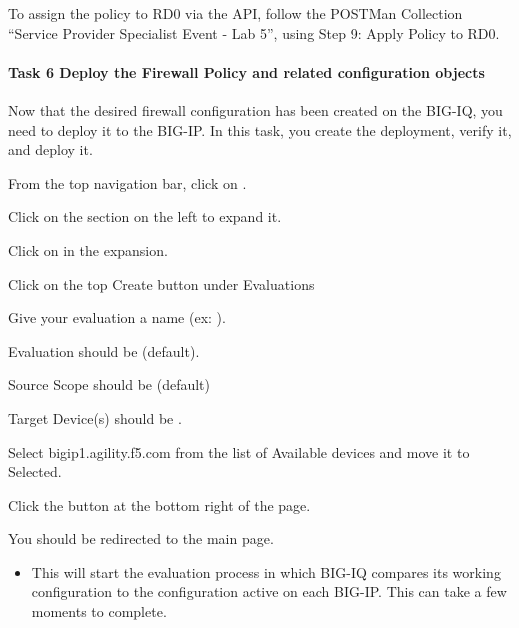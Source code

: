 \documentclass[letterpaper,10pt,english]{sphinxmanual}
\begin{document}
To assign the policy to RD0 via the API, follow the POSTMan
Collection “Service Provider Specialist Event - Lab 5”, using Step
9: Apply Policy to RD0.


\paragraph{Task 6 \textendash{} Deploy the Firewall Policy and related configuration objects}
\label{\detokenize{class1/module5/lab1:task-6-deploy-the-firewall-policy-and-related-configuration-objects}}
Now that the desired firewall configuration has been created on the
BIG-IQ, you need to deploy it to the BIG-IP. In this task, you create
the deployment, verify it, and deploy it.

From the top navigation bar, click on .

Click on the  section on the left to expand it.

Click on  in the expansion.


Click on the top Create button under Evaluations

Give your evaluation a name (ex: ).

Evaluation  should be  (default).

Source Scope should be  (default)

Target Device(s) should be .

Select bigip1.agility.f5.com from the list of Available devices and move
it to Selected.


Click the  button at the bottom right of the page.

You should be redirected to the main  page.
\begin{itemize}
\item {} 
This will start the evaluation process in which BIG-IQ compares its
working configuration to the configuration active on each BIG-IP.
This can take a few moments to complete.

\end{itemize}
\end{document}
